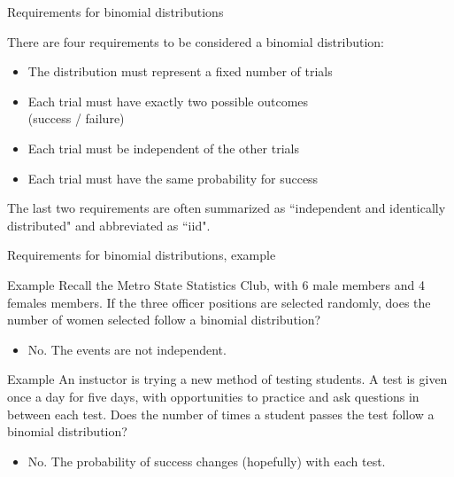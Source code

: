 \documentclass[xcolor=table, handout]{beamer}
\begin{document}
\begin{frame}{Requirements for binomial distributions}
\begin{block}{}
There are four requirements to be considered a binomial distribution:
\begin{itemize}
\pause\item The distribution must represent a fixed number of trials
\pause\item Each trial must have exactly two possible outcomes\\(success / failure)
\pause\item Each trial must be independent of the other trials
\pause\item Each trial must have the same probability for success
\end{itemize}
\pause The last two requirements are often summarized as ``independent and identically distributed" and abbreviated as ``iid".
\end{block}
\end{frame}

\begin{frame}{Requirements for binomial distributions, example}
\begin{exampleblock}{Example}
Recall the Metro State Statistics Club, with 6 male members and 4 females members. If the three officer positions are selected randomly, does the number of women selected follow a binomial distribution?
\begin{itemize}
\pause\item No. The events are not independent.
\end{itemize}
\end{exampleblock}
\pause
\begin{exampleblock}{Example}
An instuctor is trying a new method of testing students. A test is given once a day for five days, with opportunities to practice and ask questions in between each test. Does the number of times a student passes the test follow a binomial distribution?
\begin{itemize}
\pause\item No. The probability of success changes (hopefully) with each test.
\end{itemize}
\end{exampleblock}

\end{frame}
\end{document}
